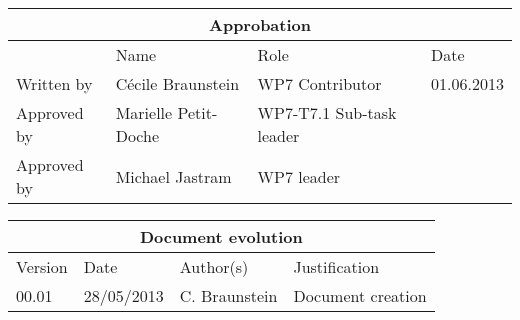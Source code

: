 \documentclass{openetcs_report}
\begin{document}
\begin{tabular}{|p{2.2cm}|p{4cm}|p{4cm}|p{2cm}|}
\hline
\multicolumn{4}{|c|}{Approbation} \\
\hline
  &  Name & Role & Date   \\
\hline  
Written by    &  C\'ecile Braunstein & WP7 Contributor  & 01.06.2013 \\
\hline
Approved by & Marielle Petit-Doche & WP7-T7.1 Sub-task  leader & \\
\hline
Approved by & Michael Jastram & WP7 leader & \\
\hline
\end{tabular}

\begin{tabular}{|p{2.2cm}|p{2cm}|p{3cm}|p{5cm}|}
\hline
\multicolumn{4}{|c|}{Document evolution} \\
\hline
Version &  Date & Author(s) & Justification  \\
\hline  
00.01 & 28/05/2013 & C. Braunstein &  Document creation  \\
\hline  

\end{tabular}



\newcommand{\tbd}{\colorbox{cyan}{\%\%To Be Defined\%\%}}
\newcommand{\tbc}{\colorbox{cyan}{\%\%To Be Confirmed\%\%}}
\newcommand{\todo}[1]{\colorbox{cyan}{\%\%{#1}\%\%}}
\newlength{\origindent}

\newenvironment{issue}{
        \begin{quote}
        \begin{itshape}Open Issue.
}{
        \end{itshape}
        \end{quote}
}

\newenvironment{comment}{
        \begin{quote}
        \begin{itshape}Comment.
}{
        \end{itshape}
        \end{quote}
}

\newenvironment{justif}{
        \begin{quote}
        \begin{itshape}Justification.
}{
        \end{itshape}
        \end{quote}
}
\end{document}
